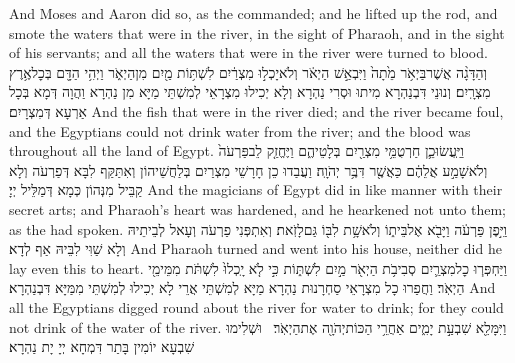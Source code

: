 {And Moses and Aaron did so, as the \lord\space commanded; and he lifted up the rod, and smote the waters that were in the river, in the sight of Pharaoh, and in the sight of his servants; and all the waters that were in the river were turned to blood.}{}
{וְהַדָּגָ֨ה אֲשֶׁר\maqqaf בַּיְאֹ֥ר מֵ֙תָה֙ וַיִּבְאַ֣שׁ הַיְאֹ֔ר וְלֹא\maqqaf יָכְל֣וּ מִצְרַ֔יִם לִשְׁתּ֥וֹת מַ֖יִם מִן\maqqaf הַיְאֹ֑ר וַיְהִ֥י הַדָּ֖ם בְּכׇל\maqqaf אֶ֥רֶץ מִצְרָֽיִם׃}
{וְנוּנֵי דִּבְנַהְרָא מִיתוּ וּסְרִי נַהְרָא וְלָא יְכִילוּ מִצְרָאֵי לְמִשְׁתֵּי מַיָּא מִן נַהְרָא וַהֲוָה דְּמָא בְּכָל אַרְעָא דְּמִצְרָיִם׃}
{And the fish that were in the river died; and the river became foul, and the Egyptians could not drink water from the river; and the blood was throughout all the land of Egypt.}{}
{וַיַּֽעֲשׂוּ\maqqaf כֵ֛ן חַרְטֻמֵּ֥י מִצְרַ֖יִם בְּלָטֵיהֶ֑ם וַיֶּחֱזַ֤ק לֵב\maqqaf פַּרְעֹה֙ וְלֹא\maqqaf שָׁמַ֣ע אֲלֵהֶ֔ם כַּאֲשֶׁ֖ר דִּבֶּ֥ר יְהֹוָֽה׃}
{וַעֲבַדוּ כֵן חָרָשֵׁי מִצְרַיִם בְּלַחֲשֵׁיהוֹן וְאִתַּקַּף לִבָּא דְּפַרְעֹה וְלָא קַבֵּיל מִנְּהוֹן כְּמָא דְּמַלֵּיל יְיָ׃}
{And the magicians of Egypt did in like manner with their secret arts; and Pharaoh’s heart was hardened, and he hearkened not unto them; as the \lord\space had spoken.}{}
{וַיִּ֣פֶן פַּרְעֹ֔ה וַיָּבֹ֖א אֶל\maqqaf בֵּית֑וֹ וְלֹא\maqqaf שָׁ֥ת לִבּ֖וֹ גַּם\maqqaf לָזֹֽאת׃}
{וְאִתְפְּנִי פַרְעֹה וְעָאל לְבֵיתֵיהּ וְלָא שַׁוִּי לִבֵּיהּ אַף לְדָא׃}
{And Pharaoh turned and went into his house, neither did he lay even this to heart.}{}
{וַיַּחְפְּר֧וּ כׇל\maqqaf מִצְרַ֛יִם סְבִיבֹ֥ת הַיְאֹ֖ר מַ֣יִם לִשְׁתּ֑וֹת כִּ֣י לֹ֤א יָֽכְלוּ֙ לִשְׁתֹּ֔ת מִמֵּימֵ֖י הַיְאֹֽר׃}
{וַחֲפַרוּ כָל מִצְרָאֵי סַחְרָנוּת נַהְרָא מַיָּא לְמִשְׁתֵּי אֲרֵי לָא יְכִילוּ לְמִשְׁתֵּי מִמַּיָּא דִּבְנַהְרָא׃}
{And all the Egyptians digged round about the river for water to drink; for they could not drink of the water of the river.}{}
{וַיִּמָּלֵ֖א שִׁבְעַ֣ת יָמִ֑ים אַחֲרֵ֥י הַכּוֹת\maqqaf יְהֹוָ֖ה אֶת\maqqaf הַיְאֹֽר׃ \petucha }
{וּשְׁלִימוּ שִׁבְעָא יוֹמִין בָּתַר דִּמְחָא יְיָ יָת נַהְרָא׃}

